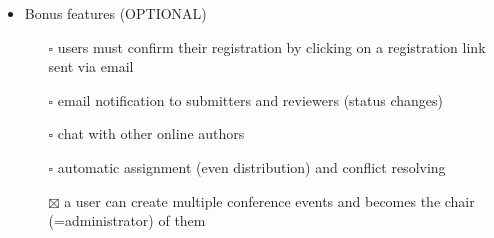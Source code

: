 \documentclass[nochapterpage,nopartpage,noheadingspace,numbersubsubsec,bigchapter,colorback,accentcolor=tud9c,10pt]{tudreport}
\begin{document}
\begin{itemize}
            \item Bonus features (OPTIONAL)
            \begin{itemize}
                \item[$\square$] users must confirm their registration by clicking on a registration link sent via email
                \item[$\square$] email notification to submitters and reviewers (status changes)
                \item[$\square$] chat with other online authors
                \item[$\square$] automatic assignment (even distribution) and conflict resolving
                \item[$\boxtimes$] a user can create multiple conference events and becomes the chair (=administrator) of them
            \end{itemize}
        \end{itemize}
\end{document}
